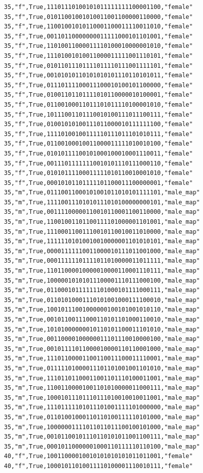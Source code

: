 \documentclass[authoryearcitations]{UoYCSproject}
\begin{document}
\begin{framed}
\begin{verbatim}
35,"f",True,11101110100101011111111100001100,"female"
35,"f",True,01011001001010011001100000110000,"female"
35,"f",True,11001001010110001100011110011010,"female"
35,"f",True,00110110000000011111000101101001,"female"
35,"f",True,11010011000011110100010000001010,"female"
35,"f",True,11101001010011000011111001110101,"female"
35,"f",True,01011011101111011110111001111101,"female"
35,"f",True,00101010110101010101110110101011,"female"
35,"f",True,01110111100011100010100101100000,"female"
35,"f",True,01001101101111010110000010100001,"female"
35,"f",True,01100100011011101011110100001010,"female"
35,"f",True,10111001101110010100111011100111,"female"
35,"f",True,01001010100111011000010111111100,"female"
35,"f",True,11110100100111110111011101010111,"female"
35,"f",True,01100100010011000011111010010100,"female"
35,"f",True,01010111100101000100010001110011,"female"
35,"f",True,00111011111110010101110111000110,"female"
35,"f",True,01010111100011111010110010001010,"female"
35,"f",True,00010101101111101100011100000001,"female"
35,"m",True,01110011000101001011010101111101,"male_map"
35,"m",True,11110011101010111010100000000101,"male_map"
35,"m",True,00111100000110010110001100110000,"male_map"
35,"m",True,11001001101100111101000001101001,"male_map"
35,"m",True,11100011001110010110010011010000,"male_map"
35,"m",True,11111101010010010000001101010101,"male_map"
35,"m",True,00001111110011000010111011001000,"male_map"
35,"m",True,00011111101111011010000011011111,"male_map"
35,"m",True,11011000010000010000110001110111,"male_map"
35,"m",True,10000010101011100001110111000100,"male_map"
35,"m",True,01100010111111101000101111000111,"male_map"
35,"m",True,01101010001110101001000111100010,"male_map"
35,"m",True,10010111001000000100101001010110,"male_map"
35,"m",True,00101100111000110101101000110010,"male_map"
35,"m",True,10101000000010110101100011101010,"male_map"
35,"m",True,00110000100000011101110010000100,"male_map"
35,"m",True,00101111011000010000110110001000,"male_map"
35,"m",True,11101100001100110011100011110001,"male_map"
35,"m",True,01111101000011101101001001101010,"male_map"
35,"m",True,11101101100011001101110100011001,"male_map"
35,"m",True,11001100001001101010000011000111,"male_map"
35,"m",True,10001011101110111010010010011001,"male_map"
35,"m",True,11101111101011101001111101000000,"male_map"
35,"m",True,01101001000110110100111110101000,"male_map"
35,"m",True,10000001111011011011100100101000,"male_map"
35,"m",True,00101100101110110101011001100111,"male_map"
35,"m",True,00010110000001000110111110110100,"male_map"
40,"f",True,10011000010010101010101011011001,"female"
40,"f",True,10001011010011110100001110010111,"female"

\end{verbatim}
\end{framed}
\end{document}
